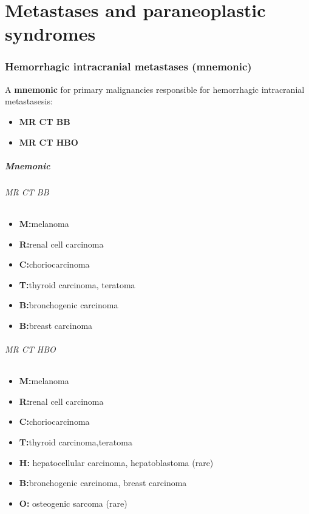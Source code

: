 \chapter{Metastases and paraneoplastic syndromes}

\subsection{Hemorrhagic intracranial metastases (mnemonic)}

A \textbf{mnemonic} for primary malignancies responsible for hemorrhagic intracranial metastasesis:

\begin{itemize}
	\item
	\textbf{MR CT BB}
	\item
	\textbf{MR CT HBO}
\end{itemize}


\paragraph{Mnemonic}


\subparagraph{MR CT BB}

\begin{itemize}
	\item
	\textbf{M:}melanoma
	\item
	\textbf{R:}renal cell carcinoma
\end{itemize}

\begin{itemize}
	\item
	\textbf{C:}choriocarcinoma
	\item
	\textbf{T:}thyroid carcinoma, teratoma
\end{itemize}

\begin{itemize}
	\item
	\textbf{B:}bronchogenic carcinoma
	\item
	\textbf{B:}breast carcinoma
\end{itemize}


\subparagraph{MR CT HBO}

\begin{itemize}
	\item
	\textbf{M:}melanoma
	\item
	\textbf{R:}renal cell carcinoma
\end{itemize}

\begin{itemize}
	\item
	\textbf{C:}choriocarcinoma
	\item
	\textbf{T:}thyroid carcinoma,teratoma
\end{itemize}

\begin{itemize}
	\item
	\textbf{H:} hepatocellular carcinoma, hepatoblastoma (rare)
	\item
	\textbf{B:}bronchogenic carcinoma, breast carcinoma
	\item
	\textbf{O:} osteogenic sarcoma (rare)
\end{itemize}